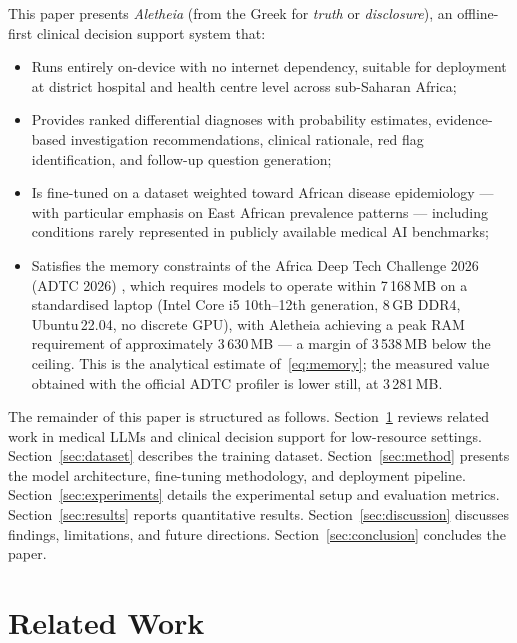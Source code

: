 \documentclass[conference]{IEEEtran}
\begin{document}
This paper presents \textit{Aletheia} (from the Greek for
\textit{truth} or \textit{disclosure}), an offline-first clinical
decision support system that:
\begin{itemize}
  \item Runs entirely on-device with no internet dependency,
        suitable for deployment at district hospital and health
        centre level across sub-Saharan Africa;
  \item Provides ranked differential diagnoses with probability
        estimates, evidence-based investigation recommendations,
        clinical rationale, red flag identification, and follow-up
        question generation;
  \item Is fine-tuned on a dataset weighted toward African disease
        epidemiology --- with particular emphasis on East African
        prevalence patterns --- including conditions rarely represented
        in publicly available medical AI benchmarks;
  \item Satisfies the memory constraints of the Africa Deep Tech
        Challenge 2026 (ADTC 2026) \cite{adtc2026}, which requires
        models to operate within 7\,168\,MB on a standardised laptop
        (Intel Core i5 10th--12th generation, 8\,GB DDR4,
        Ubuntu\,22.04, no discrete GPU), with Aletheia achieving a
        peak RAM requirement of approximately 3\,630\,MB --- a margin
        of 3\,538\,MB below the ceiling. This is the analytical
        estimate of~\eqref{eq:memory}; the measured value obtained
        with the official ADTC profiler is lower still, at
        3\,281\,MB.
\end{itemize}

The remainder of this paper is structured as follows.
Section~\ref{sec:related} reviews related work in medical LLMs
and clinical decision support for low-resource settings.
Section~\ref{sec:dataset} describes the training dataset.
Section~\ref{sec:method} presents the model architecture, fine-tuning
methodology, and deployment pipeline.
Section~\ref{sec:experiments} details the experimental setup and
evaluation metrics.
Section~\ref{sec:results} reports quantitative results.
Section~\ref{sec:discussion} discusses findings, limitations, and
future directions.
Section~\ref{sec:conclusion} concludes the paper.

\section{Related Work}
\label{sec:related}
\end{document}
